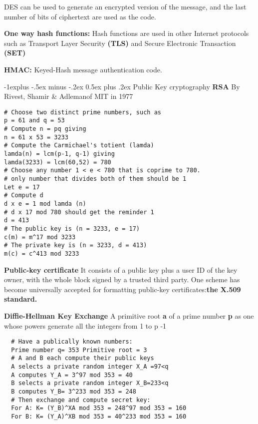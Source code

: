 \documentclass[10pt,landscape]{article}
\makeatletter
\renewcommand{\subsection}{\@startsection{subsection}{2}{0mm}%
    {-1explus -.5ex minus -.2ex}%
    {0.5ex plus .2ex}%
    {\normalfont\normalsize\bfseries}}
\makeatother
\begin{document}
\begin{multicols}{3}
DES can be used to generate an encrypted version of the message, and
the last number of bits of ciphertext are used as the code.

\textbf{One way hash functions:} Hash functions are used in other Internet protocols such as Transport
Layer Security \textbf{(TLS)} and Secure Electronic Transaction \textbf{(SET)}

\textbf{HMAC:} Keyed-Hash message authentication code.

\subsection{Public Key cryptography}
\textbf{RSA} By Rivest, Shamir \& Adlemanof MIT in 1977

\lstset{language=bash,label= ,caption= ,captionpos=b,numbers=none}
\begin{lstlisting}
# Choose two distinct prime numbers, such as
p = 61 and q = 53
# Compute n = pq giving
n = 61 x 53 = 3233
# Compute the Carmichael's totient (lamda)
lamda(n) = lcm(p-1, q-1) giving
lamda(3233) = lcm(60,52) = 780
# Choose any number 1 < e < 780 that is coprime to 780.
# only number that divides both of them should be 1
Let e = 17
# Compute d
d x e = 1 mod lamda (n)
# d x 17 mod 780 should get the reminder 1
d = 413
# The public key is (n = 3233, e = 17)
c(m) = m^17 mod 3233
# The private key is (n = 3233, d = 413)
m(c) = c^413 mod 3233
\end{lstlisting}

\textbf{Public-key certificate} It consists of a public key plus a
user ID of the key owner, with the whole block signed by a trusted
third party.
One scheme has become universally accepted for formatting public-key certificates:\textbf{the X.509 standard.} 

\textbf{Diffie-Hellman Key Exchange} A primitive root \textbf{a} of a
prime number \textbf{p} as one whose powers generate all the integers
from 1 to p -1

\lstset{language=bash,label= ,caption=,captionpos=b,numbers=none}
\begin{lstlisting}
  # Have a publically known numbers:
  Prime number q= 353 Primitive root = 3
  # A and B each compute their public keys
  A selects a private random integer X_A =97<q
  A computes Y_A = 3^97 mod 353 = 40
  B selects a private random integer X_B=233<q
  B computes Y_B= 3^233 mod 353 = 248
  # Then exchange and compute secret key:
  For A: K= (Y_B)^XA mod 353 = 248^97 mod 353 = 160
  For B: K= (Y_A)^XB mod 353 = 40^233 mod 353 = 160
\end{lstlisting}


\end{multicols}
\end{document}
